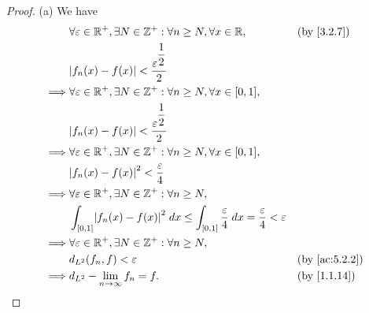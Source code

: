 \begin{proof}{(a)}
  We have
  \begin{align*}
             & \forall \varepsilon \in \R^+, \exists N \in \Z^+ : \forall n \geq N, \forall x \in \R,                                           &  & \by{3.2.7}    \\
             & \abs{f_n(x) - f(x)} < \dfrac{\varepsilon^{\dfrac{1}{2}}}{2}                                                                                         \\
    \implies & \forall \varepsilon \in \R^+, \exists N \in \Z^+ : \forall n \geq N, \forall x \in [0, 1],                                                          \\
             & \abs{f_n(x) - f(x)} < \dfrac{\varepsilon^{\dfrac{1}{2}}}{2}                                                                                         \\
    \implies & \forall \varepsilon \in \R^+, \exists N \in \Z^+ : \forall n \geq N, \forall x \in [0, 1],                                                          \\
             & \abs{f_n(x) - f(x)}^2 < \dfrac{\varepsilon}{4}                                                                                                      \\
    \implies & \forall \varepsilon \in \R^+, \exists N \in \Z^+ : \forall n \geq N,                                                                                \\
             & \int_{[0, 1]} \abs{f_n(x) - f(x)}^2 \; dx \leq \int_{[0, 1]} \dfrac{\varepsilon}{4} \; dx = \dfrac{\varepsilon}{4} < \varepsilon                    \\
    \implies & \forall \varepsilon \in \R^+, \exists N \in \Z^+ : \forall n \geq N,                                                                                \\
             & d_{L^2}(f_n, f) < \varepsilon                                                                                                    &  & \by{ac:5.2.2} \\
    \implies & d_{L^2} - \lim_{n \to \infty} f_n = f.                                                                                           &  & \by{1.1.14}
  \end{align*}
\end{proof}

